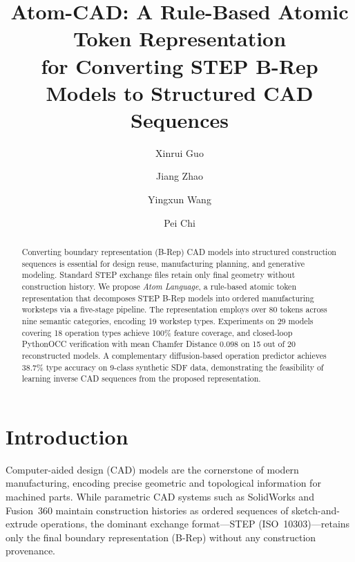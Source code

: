 \documentclass{styles/svproc}
\begin{document}
\mainmatter

\title{Atom-CAD: A Rule-Based Atomic Token Representation\\for Converting STEP B-Rep Models to Structured CAD Sequences}


\author{Xinrui Guo \and Jiang Zhao \and Yingxun Wang
\and Pei Chi}




\maketitle

\begin{abstract}
Converting boundary representation (B-Rep) CAD models into structured construction sequences is essential for design reuse, manufacturing planning, and generative modeling. Standard STEP exchange files retain only final geometry without construction history. We propose \emph{Atom Language}, a rule-based atomic token representation that decomposes STEP B-Rep models into ordered manufacturing worksteps via a five-stage pipeline. The representation employs over 80 tokens across nine semantic categories, encoding 19 workstep types. Experiments on 29 models covering 18 operation types achieve 100\% feature coverage, and closed-loop PythonOCC verification with mean Chamfer Distance 0.098 on 15 out of 20 reconstructed models. A complementary diffusion-based operation predictor achieves 38.7\% type accuracy on 9-class synthetic SDF data, demonstrating the feasibility of learning inverse CAD sequences from the proposed representation.
\end{abstract}

\section{Introduction}
\label{sec:intro}
Computer-aided design (CAD) models are the cornerstone of modern manufacturing, encoding precise geometric and topological information for machined parts. While parametric CAD systems such as SolidWorks and Fusion~360 maintain construction histories as ordered sequences of sketch-and-extrude operations, the dominant exchange format---STEP (ISO~10303)---retains only the final boundary representation (B-Rep) without any construction provenance.
\end{document}
